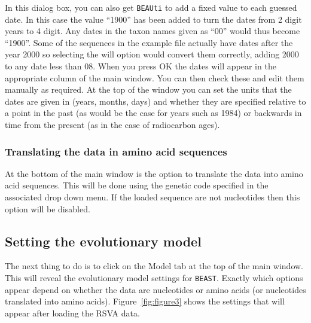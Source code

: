 \documentclass[cup7b, english]{cupbook}
\begin{document}
In this dialog box, you can also get \texttt{BEAUti} to add a fixed value to each guessed date. In this case the
value ``1900'' has been added to turn the dates from 2 digit years to 4 digit. Any dates in the taxon names
given as ``00'' would thus become ``1900''. Some of the sequences in the example file actually have dates 
after the year 2000 so selecting the will option would convert them correctly, adding 2000 to any date less than 08.
When you press OK the dates will appear in the appropriate column of the main window. You can then check
these and edit them manually as required. At the top of the window you can set the units that the dates
are given in (years, months, days) and whether they are specified relative to a point in the past (as
would be the case for years such as 1984) or backwards in time from the present (as in the case of
radiocarbon ages).

\subsubsection{Translating the data in amino acid sequences}

At the bottom of the main window is the option to translate the data into amino acid sequences. This will
be done using the genetic code specified in the associated drop down menu. If the loaded sequence are not
nucleotides then this option will be disabled.

\subsection{Setting the evolutionary model}

The next thing to do is to click on the Model tab at the top of the main window. This will reveal the
evolutionary model settings for \texttt{BEAST}. Exactly which options appear depend on whether the data are
nucleotides or amino acids (or nucleotides translated into amino acids). Figure~\ref{fig:figure3}
shows the settings that will appear after loading the RSVA data.
\end{document}
